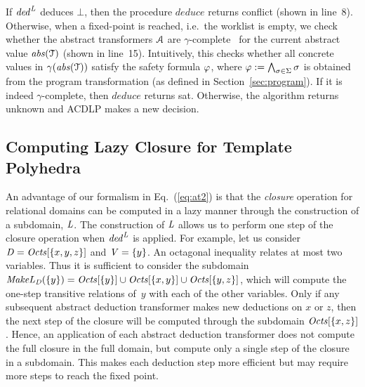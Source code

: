 If $\mathit{ded}^{\mathit{L}}$ deduces $\bot$, then 
the procedure $\mathit{deduce}$ returns \textsf{conflict} (shown in line~8).
Otherwise, when a fixed-point is reached, i.e.~the worklist is empty, we check whether
the abstract transformers $\mathcal{A}$ are $\gamma$-complete~\cite{dhk2013-popl} for the current abstract value $\mathit{abs}(\mathcal{T})$ 
(shown in line~15).
%
Intuitively, this checks whether all concrete values in 
$\gamma(\mathit{abs}(\mathcal{T}))$ satisfy the safety formula $\varphi$, where 
$\varphi:= \bigwedge_{\sigma\in\Sigma} \sigma$ is obtained 
from the program transformation (as defined in Section~\ref{sec:program}).
%
If it is indeed 
$\gamma$-complete, then $\mathit{deduce}$ returns \textsf{sat}.  Otherwise, the 
algorithm returns \textsf{unknown} and ACDLP makes a new decision.    
%
\subsection{Computing Lazy Closure for Template Polyhedra}\label{lazyclosure}
%
An advantage of our formalism in Eq.~(\ref{eq:at2}) is that the 
\emph{closure} operation for relational domains can be computed 
in a lazy manner through the construction of a subdomain, $\mathit{L}$.  
The construction of $\mathit{L}$ allows us to perform one step of the 
closure operation when $\mathit{ded}^{\mathit{L}}$ is applied.
%
For example, let us consider $\mathit{D}=\mathit{Octs}[\{x,y,z\}]$ and
$\mathit{V}=\{y\}$. An octagonal inequality relates at 
most two variables. Thus it is sufficient to consider the subdomain
$\mathit{MakeL}_{\mathit{D}}(\{y\})=\mathit{Octs}[\{y\}]\cup\mathit{Octs}[\{x,y\}]\cup\mathit{Octs}[\{y,z\}]$,
which will compute the one-step transitive relations of~$y$ with each
of the other variables. 
%
Only if any subsequent abstract deduction transformer makes new deductions 
on $x$ or $z$, then the next step of the closure will be computed through 
the subdomain $\mathit{Octs}[\{x,z\}]$.
Hence, an application of each abstract deduction transformer does not 
compute the full closure in the full domain, but compute only a single 
step of the closure in a subdomain. This makes each deduction step more 
efficient but may require more steps to reach the fixed point.  

%
